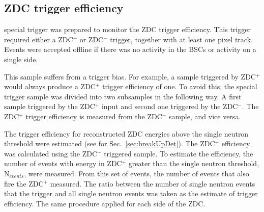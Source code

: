     \DIFaddend \subsection{ZDC trigger efficiency}
      \DIFdelbegin {}\DIFdelend \DIFaddbegin {}\DIFaddend special trigger was 
        prepared to monitor the ZDC trigger efficiency. 
      This trigger required either a ZDC$^{+}$ or ZDC$^{-}$ trigger, together with at 
        least one pixel track. 
      Events were accepted offline if there was no activity in the BSCs or 
        activity on a single side. 
\DIFaddbegin 

      \DIFaddend This sample suffers from a trigger bias. 
      For example, a sample triggered by ZDC$^{+}$ would always produce a ZDC$^{+}$ 
        trigger efficiency of one. 
      To avoid this, the special trigger sample was divided into two 
        subsamples in the following way. 
      A first sample triggered by the ZDC$^{+}$ input and second one triggered by 
        the ZDC$^{-}$. 
      The ZDC$^{+}$ trigger efficiency is measured from the ZDC$^{-}$ sample, and vice 
        versa.

      The trigger efficiency for reconstructed ZDC energies above the
        single neutron threshold were estimated (see for Sec.~\ref{sec:breakUpDet}).
      The ZDC$^{+}$ efficiency was calculated using the ZDC$^{-}$ triggered 
        sample.
      To estimate the efficiency, the number of events with energy in 
        ZDC$^{+}$ greater than the single neutron threshold, N$_{events}$, 
        were measured.
      From this set of events, the number of events that also fire the 
        ZDC$^{+}$ \DIFdelbegin {}\DIFdelend \DIFaddbegin {}\DIFaddend measured.
      The ratio between the number of single neutron events that \DIFdelbegin {}\DIFdelend \DIFaddbegin {}\DIFaddend the 
        trigger and all single neutron events was taken as the estimate of 
        trigger efficiency. 
      The same procedure \DIFdelbegin {}\DIFdelend \DIFaddbegin {}\DIFaddend applied for each side of the ZDC.
      \DIFaddbegin {}\DIFaddend 

